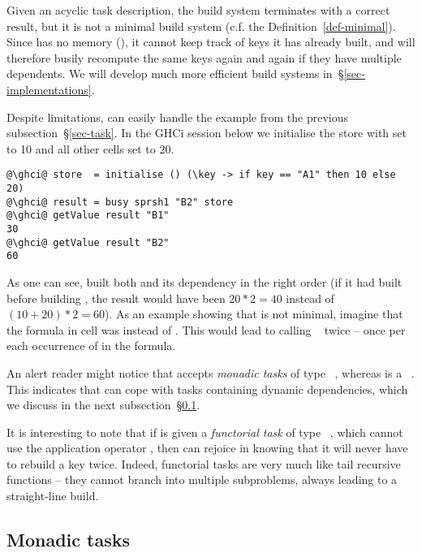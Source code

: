 Given an acyclic task description, the  build system terminates with a
correct result, but it is not a minimal build system (c.f. the
Definition~\ref{def-minimal}). Since  has no memory (), it
cannot keep track of keys it has already built, and will therefore busily
recompute the same keys again and again if they have multiple dependents. We
will develop much more efficient build systems in~\S\ref{sec-implementations}.

Despite limitations,  can easily handle the example 
from the previous subsection~\S\ref{sec-task}. In the GHCi session below we
initialise the store with  set to 10 and all other cells set to 20.

\begin{verbatim}
@\ghci@ store  = initialise () (\key -> if key == "A1" then 10 else 20)
@\ghci@ result = busy sprsh1 "B2" store
@\ghci@ getValue result "B1"
30
@\ghci@ getValue result "B2"
60
\end{verbatim}

\noindent
As one can see,  built both  and its dependency  in the
right order (if it had built  before building , the result would
have been $20 * 2 = 40$ instead of $(10 + 20) * 2 = 60$). As an example showing
that  is not minimal, imagine that the formula in cell  was
 instead of . This would lead to calling
~ twice -- once per each occurrence of  in the
formula.

An alert reader might notice that  accepts \emph{monadic tasks} of
type ~, whereas  is a ~.
This indicates that  can cope with tasks containing dynamic
dependencies, which we discuss in the next subsection~\S\ref{sec-task-monad}.

It is interesting to note that if  is given a \emph{functorial task}
of type ~, which cannot use the application operator
\hs{<*>}, then  can rejoice in knowing that it will never have to
rebuild a key twice. Indeed, functorial tasks are very much like tail recursive
functions -- they cannot branch into multiple subproblems, always leading to a
straight-line build.

\subsection{Monadic tasks}\label{sec-task-monad}

